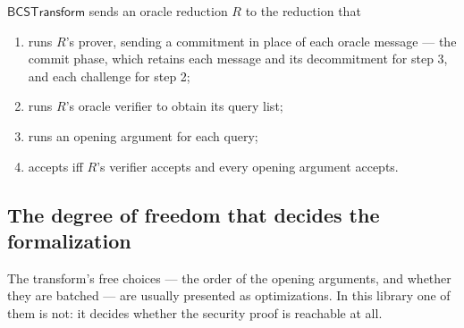 \begin{definition}
    \label{def:bcs}
    $\mathsf{BCSTransform}$ sends an oracle reduction $R$ to the reduction that
    \begin{enumerate}
        \item runs $R$'s prover, sending a commitment in place of each oracle message ---
            the commit phase, which retains each message and its decommitment for step 3, and
            each challenge for step 2;
        \item runs $R$'s oracle verifier to obtain its query list;
        \item runs an opening argument for each query;
        \item accepts iff $R$'s verifier accepts and every opening argument accepts.
    \end{enumerate}
\end{definition}

\subsection{The degree of freedom that decides the formalization}\label{sec:bcs_batching}

The transform's free choices --- the order of the opening arguments, and whether they are batched
--- are usually presented as optimizations. In this library one of them is not: it decides whether
the security proof is reachable at all.

